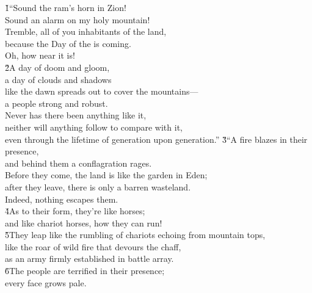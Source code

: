 \begin{poetry}
\poeml {}
\v{1}``Sound the ram's horn in Zion! \\
\poeml Sound an alarm on my holy mountain! \\
\poeml Tremble, all of you inhabitants of the land, \\
\poeml because the Day of the  is coming. \\
\poemlll       Oh, how near it is! \\
\poeml \v{2}A day of doom and gloom, \\
\poemll    a day of clouds and shadows \\
\poeml like the dawn spreads out to cover the mountains--- \\
\poemll    a people strong and robust. \\
\poeml Never has there been anything like it, \\
\poemll    neither will anything follow to compare with it, \\
\poemlll       even through the lifetime of generation upon generation.''
\poeml \v{3}``A fire blazes in their presence, \\
\poemll    and behind them a conflagration rages. \\
\poeml Before they come, the land is like the garden in Eden; \\
\poemll    after they leave, there is only a barren wasteland. \\
\poemlll       Indeed, nothing escapes them. \\
\poeml \v{4}As to their form, they're like horses; \\
\poemll    and like chariot horses, how they can run! \\
\poeml \v{5}They leap like the rumbling of chariots echoing from mountain tops, \\
\poemll    like the roar of wild fire that devours the chaff, \\
\poemlll       as an army firmly established in battle array. \\
\poeml \v{6}The people are terrified in their presence; \\
\poemll    every face grows pale. \\

\end{poetry}
